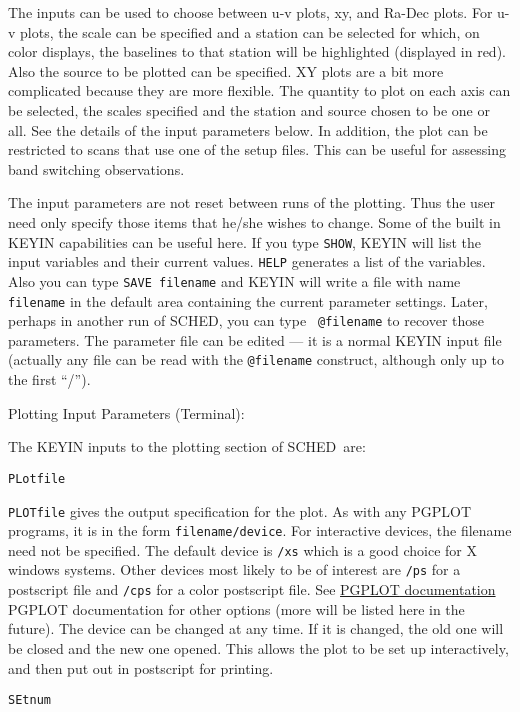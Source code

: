 \documentclass{report}
\newcommand{\sched}{{\sc SCHED}}
\newcommand{\schedb}{{\sc SCHED~}}
\begin{document}
The inputs can be used to choose between u-v plots, xy, and Ra-Dec
plots.  For u-v plots, the scale can be specified and a station can be
selected for which, on color displays, the baselines to that station
will be highlighted (displayed in red).  Also the source to be plotted
can be specified.  XY plots are a bit more complicated because they
are more flexible.  The quantity to plot on each axis can be selected,
the scales specified and the station and source chosen to be one or
all.  See the details of the input parameters below.  In addition, the
plot can be restricted to scans that use one of the setup files.  This
can be useful for assessing band switching observations.

The input parameters are not reset between runs of the plotting.  Thus
the user need only specify those items that he/she wishes to change.
Some of the built in KEYIN capabilities can be useful here.  If you
type {\tt SHOW}, KEYIN will list the input variables and their current
values.  {\tt HELP} generates a list of the variables.  Also you can
type {\tt SAVE filename} and KEYIN will write a file with name {\tt
filename} in the default area containing the current parameter
settings.  Later, perhaps in another run of \sched, you can type {\tt
@filename} to recover those parameters.  The parameter file can be
edited --- it is a normal KEYIN input file (actually any file can be
read with the {\tt @filename} construct, although only up to the first
``/'').

Plotting Input Parameters (Terminal):

The KEYIN inputs to the plotting section of \schedb are:

{\tt PLotfile}

{\tt PLOTfile} gives the output specification for the plot.  As with
any {\sc PGPLOT} programs, it is in the form {\tt filename/device}.
For interactive devices, the filename need not be specified.  The
default device is {\tt /xs} which is a good choice for X windows systems.
Other devices most likely to be of interest are {\tt /ps} for a postscript
file and {\tt /cps} for a color postscript file.  See
{\href{http://www.astro.caltech.edu/~tjp/pgplot/}{{\sc PGPLOT} documentation}}
{\sc PGPLOT}
documentation for other options (more will be listed here in the future).
The device can be changed at any time.
If it is changed, the old one will be closed and the new one opened.  This
allows the plot to be set up interactively, and then put out in postscript
for printing.

{\tt SEtnum}
\end{document}
